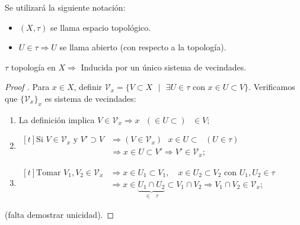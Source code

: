	\begin{remark}
		Se utilizará la siguiente notación:
		\begin{itemize}
			\item $(X,\tau)$ se llama espacio topológico.

			\item $U \in \tau \Rightarrow U$ se llama abierto (con respecto a la topología).
		\end{itemize}
	\end{remark}

	\begin{lemma}
		$\tau$ topología en $X \Rightarrow$ Inducida por un único sistema de vecindades.
	\end{lemma}

	\begin{proof}[Proof ]
		Para $x \in X$, definir $\mathcal{V}_x = \{ V \subset X \text{ } | \text{ } \exists U \in \tau \text{ con } x \in U \subset V \}$. Verificamos que $\{ \mathcal{V}_x \}_x$ es sistema de vecindades:

		\begin{enumerate}
			\item La definición implica $V \in \mathcal{V}_x \Rightarrow x \text{ } (\in U \subset) \text{ } \in V$;

			\item $\begin{aligned}[t]
				\text{Si } V \in \mathcal{V}_x \text{ y } V' \supset V & \Rightarrow (V \in \mathcal{V}_x) \text{ } x \in U \subset \text{ } (U \in \tau) \\
				& \Rightarrow x \in U \subset V' \Rightarrow V' \in \mathcal{V}_x;
			\end{aligned}$

			\item $\begin{aligned}[t]
				\text{Tomar } V_1,V_2 \in \mathcal{V}_x & \Rightarrow x \in U_1 \subset V_1, \quad x \in U_2 \subset V_2 \text{ con } U_1,U_2 \in \tau \\
				& \Rightarrow x \in \underbrace{U_1 \cap U_2}_{\in \text{ } \tau} \subset V_1 \cap V_2 \Rightarrow V_1 \cap V_2 \in \mathcal{V}_x;
			\end{aligned}$
		\end{enumerate}

		(falta demostrar unicidad).
	\end{proof}


